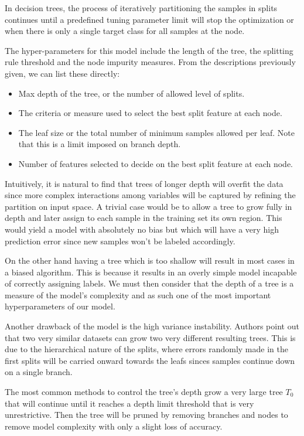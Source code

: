 In decision trees, the process of iteratively partitioning the samples in splits continues until a predefined tuning parameter limit will stop the optimization or when there is only a single target class for all samples at the node.

The hyper-parameters for this model include the length of the tree,  the splitting rule threshold and the node impurity measures. From the descriptions previously given, we can list these directly:

\begin{itemize}
\item Max depth of the tree, or the number of allowed level of splits.
\item The criteria or measure used to select the best split feature at each node.
\item The leaf size or the total number of minimum samples allowed per leaf. Note that this is a limit imposed on  branch depth.
\item Number of features selected to decide on the best split feature at each node.
\end{itemize}


Intuitively, it is natural to find that trees of longer depth will overfit the data since more complex interactions among variables will be captured by refining the partition on input space. A trivial case would be to allow a tree to grow fully in depth and later assign to each sample in the training set its own region. This would yield a model with absolutely no bias but which will have a very high prediction error since new samples won't be labeled accordingly.

On the other hand having a tree which is too shallow will result in most cases in a biased algorithm.  This is because it results in an overly simple model incapable of correctly assigning labels.  We must then consider that the depth of a tree is a measure of the model's complexity and as such one of the most important hyperparameters of our model.

Another drawback of the model is the high variance instability. Authors point out that two very similar datasets can grow two very different resulting trees. This is due to the hierarchical nature of the splits, where errors randomly made in the first splits will be carried onward towards the leafs sinces samples continue down on a single branch.

The most common methods to control the tree's depth grow a very large tree $T_0$ that will continue until it reaches a depth limit threshold that is very unrestrictive. Then the tree will be pruned by removing branches and nodes to remove model complexity with only  a slight loss of accuracy.

